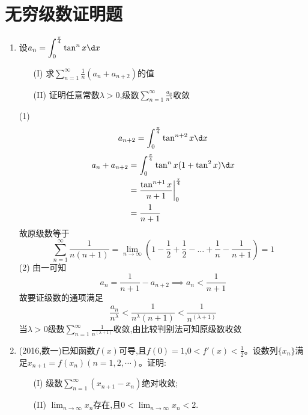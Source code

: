 \documentclass[12pt, a4paper, oneside, UTF8]{ctexbook}
\begin{document}
\section{无穷级数证明题}

\begin{enumerate}[label=\arabic*.,start=12]
    \item  设$\displaystyle a_n=\int_{0}^{\frac{\pi}{4}}\tan^{n}x\d x$ 
    \begin{enumerate}
        \item [(I)] 求$\displaystyle \sum_{n=1}^{\infty}\frac{1}{n}(a_n+a_{n+2})$的值 
        \item [(II)] 证明任意常数$\lambda>0$,级数$\displaystyle\sum_{n=1}^{\infty}\frac{a_n}{n^{\lambda}}$收敛
    \end{enumerate}

    \begin{solution}
        (1)
        $$
        a_{n+2}=\int_{0}^{\frac{\pi}{4}}\tan^{n+2}x\d x 
        $$
        \begin{align*}
            a_{n}+a_{n+2} &= \int_{0}^{\frac{\pi}{4}}\tan^{n}x(1+\tan^2{x})\d x \\
            &=\frac{\tan^{n+1}x}{n+1}\bigg|^{\frac{\pi}{4}}_{0} \\
            &=\frac{1}{n+1}
        \end{align*}
        故原级数等于
        $$
        \sum_{n=1}^{\infty}\frac{1}{n(n+1)} = \lim_{n\to\infty}\left(1-\frac{1}{2}+\frac{1}{2}-\ldots+\frac{1}{n}-\frac{1}{n+1}\right) = 1
        $$
        (2) 由一可知 
        $$
        a_n = \frac{1}{n+1} - a_{n+2} \implies a_n < \frac{1}{n+1}
        $$
        故要证级数的通项满足
        $$
        \frac{a_n}{n^{\lambda}} < \frac{1}{n^{\lambda}(n+1)} < \frac{1}{n^{(\lambda+1)}}
        $$
        当$\lambda>0$级数$\displaystyle \sum_{n=1}^{\infty}\frac{1}{n^{(\lambda+1)}}$收敛,由比较判别法可知原级数收敛
    \end{solution}
    \newpage
    \item (2016,数一)已知函数$f(x)$可导,且$f(0)=1$,$0<f'(x)<\frac{1}{2}$。设数列$\{x_n\}$满足$x_{n+1}=f(x_n)(n=1,2,\cdots)$。证明:
    \begin{enumerate}[label=(\roman*)]
        \item[(I)] 级数$\displaystyle\sum_{n=1}^{\infty}(x_{n+1}-x_n)$绝对收敛;
        \item[(II)] $\displaystyle\lim_{n\rightarrow\infty} x_n$存在,且$\displaystyle 0<\lim_{n\rightarrow\infty} x_n<2$.
    \end{enumerate}
    

\end{enumerate}
\end{document}
